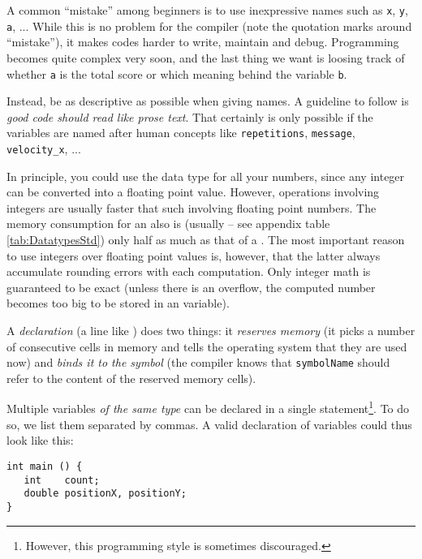 \begin{hintbox}
A common \enquote{mistake} among beginners is to use inexpressive names such as \texttt{x}, \texttt{y}, \texttt{a}, ... While this is no problem for the compiler (note the quotation marks around \enquote{mistake}), it makes codes harder to write, maintain and debug. Programming becomes quite complex very soon, and the last thing we want is loosing track of whether \texttt{a} is the total score or which meaning behind the variable \texttt{b}.

Instead, be as descriptive as possible when giving names. A guideline to follow is \emph{good code should read like prose text}. That certainly is only possible if the variables are named after human concepts like \texttt{repetitions}, \texttt{message}, \texttt{velocity\_x}, ...
\end{hintbox}

\begin{hintbox}
In principle, you could use the data type  for all your numbers, since any integer can be converted into a floating point value. However, operations involving integers are usually faster that such involving floating point numbers. The memory consumption for an  also is (usually -- see appendix table \ref{tab:DatatypesStd}) only half as much as that of a . The most important reason to use integers over floating point values is, however, that the latter always accumulate rounding errors with each computation. Only integer math is guaranteed to be exact (unless there is an overflow, \ie the computed number becomes too big to be stored in an  variable).
\end{hintbox}

A \emph{declaration} (\ie a line like ) does two things: it \emph{reserves memory} (\ie it picks a number of consecutive cells in memory and tells the operating system that they are used now) and \emph{binds it to the symbol} (\ie the compiler knows that \texttt{symbolName} should refer to the content of the reserved memory cells).

Multiple variables \emph{of the same type} can be declared in a single statement\footnote{However, this programming style is sometimes discouraged.}. To do so, we list them separated by commas. A valid declaration of variables could thus look like this:
\begin{codebox}[declarations.c]
\begin{verbatim}
int main () {
   int    count;
   double positionX, positionY;
}
\end{verbatim}
 \label{code:declaringVars}
\end{codebox}

